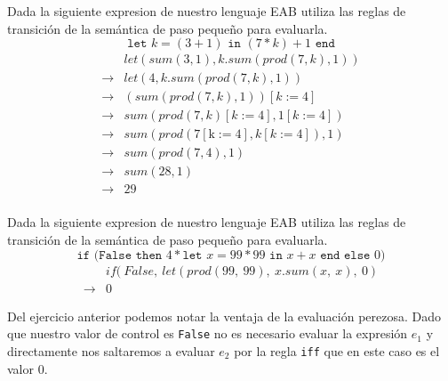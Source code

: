     \begin{exercise}
        Dada la siguiente expresion de nuestro lenguaje \textsf{EAB} utiliza las reglas de transición de la semántica de paso pequeño para evaluarla.
        \[
            \texttt{let } k = (3 + 1) \texttt{ in } (7 * k) + 1 \texttt{ end} 
        \]
        \[
            \begin{array}{cl}
                &\textit{let}(\textit{sum}(3,1), \textit{k}.\textit{sum}(\textit{prod}(7,\textit{k}), 1))\\
                \rightarrow &\textit{let}(4, \textit{k}.\textit{sum}(\textit{prod}(7, \textit{k}), 1))\\
                \rightarrow &(\textit{sum}(\textit{prod}(7, \textit{k}),1))[\textit{k}:=4]\\
                \rightarrow &\textit{sum}(\textit{prod}(7, \textit{k})[\textit{k}:=4],1[\textit{k}:=4])\\
                \rightarrow &\textit{sum}(\textit{prod}(7[\text{k}:=4], \textit{k}[\textit{k}:=4]),1)\\
                \rightarrow &\textit{sum}(\textit{prod}(7, 4), 1)\\
                \rightarrow &\textit{sum}(28, 1)\\
                \rightarrow &29\\
                

            \end{array}
        \]
        
    \end{exercise}


    \begin{exercise}
        Dada la siguiente expresion de nuestro lenguaje \textsf{EAB} utiliza las reglas de transición de la semántica de paso pequeño para evaluarla.
        \[
            \texttt{if (}\texttt{False} \texttt{ then } 4 * \texttt{let } x = 99 * 99 \texttt{ in } x + x \texttt{ end} \texttt{ else } 0 \texttt{)}
        \] 
        \[
            \begin{array}{cl}
                &if(\ False,\ let(prod(99,\ 99),\ x.sum(x,\ x),\ 0)\\
                \rightarrow &0

            \end{array}
        \]
    \end{exercise}

    Del ejercicio anterior podemos notar la ventaja de la evaluación perezosa. Dado que nuestro valor de control es \texttt{False} no es necesario evaluar la expresión $e_1$ y directamente nos saltaremos a evaluar $e_2$ por la regla \texttt{iff} que en este caso es el valor 0.\\
    
